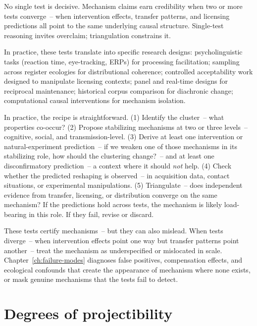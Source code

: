 No single test is decisive. Mechanism claims earn credibility when two or more tests converge~-- when intervention effects, transfer patterns, and licensing predictions all point to the same underlying causal structure. Single-test reasoning invites overclaim; triangulation constrains it.

In practice, these tests translate into specific research designs: psycholinguistic tasks (reaction time, eye-tracking, ERPs) for processing facilitation; sampling across register ecologies for distributional coherence; controlled acceptability work designed to manipulate licensing contexts; panel and real-time designs for reciprocal maintenance; historical corpus comparison for diachronic change; computational causal interventions for mechanism isolation.

In practice, the recipe is straightforward. (1) Identify the cluster~-- what properties co-occur? (2) Propose stabilizing mechanisms at two or three levels~-- cognitive, social, and transmission-level. (3) Derive at least one intervention or natural-experiment prediction~-- if we weaken one of those mechanisms in its stabilizing role, how should the clustering change?~-- and at least one disconfirmatory prediction~-- a context where it should \emph{not} help. (4) Check whether the predicted reshaping is observed~-- in acquisition data, contact situations, or experimental manipulations. (5) Triangulate~-- does independent evidence from transfer, licensing, or distribution converge on the same mechanism? If the predictions hold across tests, the mechanism is likely load-bearing in this role. If they fail, revise or discard.

These tests certify mechanisms~-- but they can also mislead. When tests diverge~-- when intervention effects point one way but transfer patterns point another~-- treat the mechanism as underspecified or mislocated in scale. Chapter~\ref{ch:failure-modes} diagnoses false positives, compensation effects, and ecological confounds that create the appearance of mechanism where none exists, or mask genuine mechanisms that the tests fail to detect.


\section{Degrees of projectibility}
\label{sec:6:degrees-projectibility}

